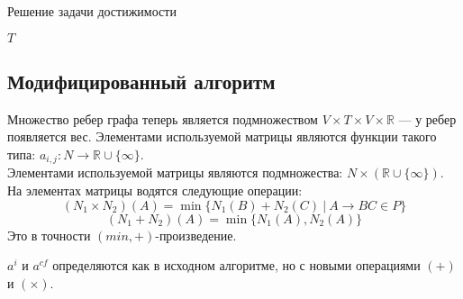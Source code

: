 \documentclass[14pt]{matmex-diploma}
\theoremstyle{definition}
\begin{document}
        \begin{algorithm}[H]
        \begin{algorithmic}[1]
        \caption{Решение задачи достижимости}
        \label{alg:graphParse}
            \EndFor    
            \EndWhile
        \State \Return $T$
        \EndFunction
        \end{algorithmic}
        \end{algorithm}
    \subsection{Модифицированный алгоритм}
        Множество ребер графа теперь является подмножеством $V \times T \times V \times \mathbb{R}$ --- у ребер появляется вес. Элементами используемой матрицы являются функции такого типа: $a_{i,j}: N\rightarrow\mathbb{R}\cup\{\infty\}$.\\
        Элементами используемой матрицы являются подмножества: $N\times(\mathbb{R}\cup\{\infty\})$.\\
        На элементах матрицы водятся следующие операции:
        \begin{equation*}
            (N_1 \times N_2)(A) = \min\{N_1(B) + N_2(C)~|~A \rightarrow BC \in P\}
        \end{equation*}
        \begin{equation*}
            (N_1 + N_2)(A) = \min\{N_1(A), N_2(A)\}
        \end{equation*}
        Это в точности $(min, +)$-произведение.
        
        $a^i$ и $a^{cf}$ определяются как в исходном алгоритме, но с новыми операциями $(+)$ и $(\times)$.
        
\end{document}
